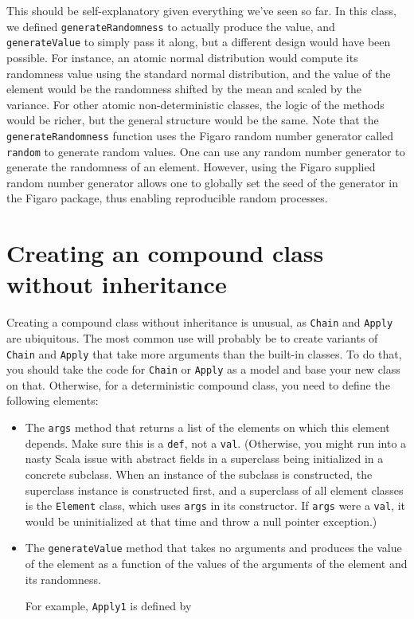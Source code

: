 This should be self-explanatory given everything we've seen so far. In this class, we defined \texttt{generateRandomness} to actually produce the value, and \texttt{generateValue} to simply pass it along, but a different design would have been possible. For instance, an atomic normal distribution would compute its randomness value using the standard normal distribution, and the value of the element would be the randomness shifted by the mean and scaled by the variance. For other atomic non-deterministic classes, the logic of the methods would be richer, but the general structure would be the same. Note that the \texttt{generateRandomness} function uses the Figaro random number generator called \texttt{random} to generate random values. One can use any random number generator to generate the randomness of an element. However, using the Figaro supplied random number generator allows one to globally set the seed of the generator in the Figaro package, thus enabling reproducible random processes.

\section{Creating an compound class without inheritance}

Creating a compound class without inheritance is unusual, as \texttt{Chain} and \texttt{Apply} are ubiquitous. The most common use will probably be to create variants of \texttt{Chain} and \texttt{Apply} that take more arguments than the built-in classes. To do that, you should take the code for \texttt{Chain} or \texttt{Apply} as a model and base your new class on that. Otherwise, for a deterministic compound class, you need to define the following elements:

\begin{itemize}
\item The \texttt{args} method that returns a list of the elements on which this element depends. Make sure this is a \texttt{def}, not a \texttt{val}. (Otherwise, you might run into a nasty Scala issue with abstract fields in a superclass being initialized in a concrete subclass. When an instance of the subclass is constructed, the superclass instance is constructed first, and a superclass of all element classes is the \texttt{Element} class, which uses \texttt{args} in its constructor. If \texttt{args} were a \texttt{val}, it would be uninitialized at that time and throw a null pointer exception.)
\item The  \texttt{generateValue} method that takes no arguments and produces the value of the element as a function of the values of the arguments of the element and its randomness.

For example, \texttt{Apply1} is defined by

\end{itemize}

